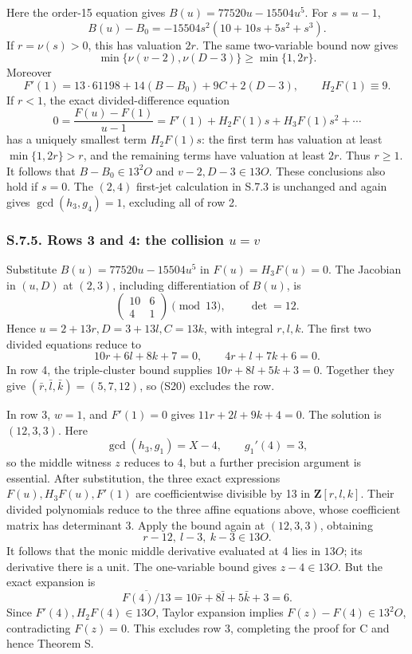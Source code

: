 \documentclass[
  british,
  10pt,
]{article}
\begin{document}
Here the order-15 equation gives \(B(u)=77520u-15504u^5\). For
\(s=u-1\), \[
B(u)-B_0=-15504s^2(10+10s+5s^2+s^3).
\tag{S21}
\] If \(r=\nu(s)>0\), this has valuation \(2r\). The same two-variable
bound now gives \[
\min\{\nu(v-2),\nu(D-3)\}\ge\min\{1,2r\}.
\] Moreover \[
F'(1)=13\cdot61198+14(B-B_0)+9C+2(D-3),
\qquad H_2F(1)\equiv9.
\] If \(r<1\), the exact divided-difference equation \[
0=\frac{F(u)-F(1)}{u-1}
 =F'(1)+H_2F(1)s+H_3F(1)s^2+\cdots
\] has a uniquely smallest term \(H_2F(1)s\): the first term has
valuation at least \(\min\{1,2r\}>r\), and the remaining terms have
valuation at least \(2r\). Thus \(r\ge1\). It follows that
\(B-B_0\in13^2O\) and \(v-2,D-3\in13O\). These conclusions also hold if
\(s=0\). The \((2,4)\) first-jet calculation in S.7.3 is unchanged and
again gives \(\gcd(h_3,g_4)=1\), excluding all of row 2.

\subsubsection{\texorpdfstring{S.7.5. Rows 3 and 4: the collision
\(u=v\)}{S.7.5. Rows 3 and 4: the collision u=v}}\label{s.7.5.-rows-3-and-4-the-collision-uv}

Substitute \(B(u)=77520u-15504u^5\) in \(F(u)=H_3F(u)=0\). The Jacobian
in \((u,D)\) at \((2,3)\), including differentiation of \(B(u)\), is \[
\begin{pmatrix}10&6\\4&1\end{pmatrix}\pmod{13},
\qquad\det=12.
\] Hence \(u=2+13r,D=3+13l,C=13k\), with integral \(r,l,k\). The first
two divided equations reduce to \[
10r+6l+8k+7=0,\qquad4r+l+7k+6=0.
\tag{S22}
\] In row 4, the triple-cluster bound supplies \(10r+8l+5k+3=0\).
Together they give \((\bar r,\bar l,\bar k)=(5,7,12)\), so (S20)
excludes the row.

In row 3, \(w=1\), and \(F'(1)=0\) gives \(11r+2l+9k+4=0\). The solution
is \((12,3,3)\). Here \[
\gcd(h_3,g_1)=X-4,\qquad g_1'(4)=3,
\] so the middle witness \(z\) reduces to 4, but a further precision
argument is essential. After substitution, the three exact expressions
\(F(u),H_3F(u),F'(1)\) are coefficientwise divisible by 13 in
\(\mathbf Z[r,l,k]\). Their divided polynomials reduce to the three
affine equations above, whose coefficient matrix has determinant 3.
Apply the bound again at \((12,3,3)\), obtaining \[
r-12,\ l-3,\ k-3\in13O.
\tag{S23}
\] It follows that the monic middle derivative evaluated at 4 lies in
\(13O\); its derivative there is a unit. The one-variable bound gives
\(z-4\in13O\). But the exact expansion is \[
\overline{F(4)/13}
=10\bar r+8\bar l+5\bar k+3=6.
\] Since \(F'(4),H_2F(4)\in13O\), Taylor expansion implies
\(F(z)-F(4)\in13^2O\), contradicting \(F(z)=0\). This excludes row 3,
completing the proof for C and hence Theorem S.
\end{document}
